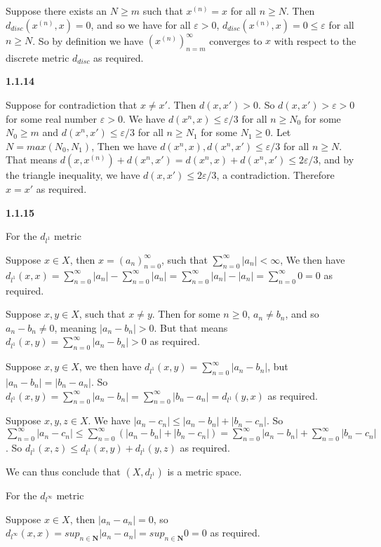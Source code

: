 \documentclass[12pt]{article}
\begin{document}
Suppose there exists an $N\geq m$ such that $x^{(n)} = x$ for all $n\geq N$. Then $d_{disc}(x^{(n)},x) = 0$, and so we have for all $\varepsilon >0$, $d_{disc}(x^{(n)},x) = 0\leq \varepsilon$ for all $n\geq N$. So by definition we have $(x^{(n)})_{n=m}^\infty$ converges to $x$ with respect to the discrete metric $d_{disc}$
as required.

\textbf{1.1.14}

Suppose for contradiction that $x\neq x'$. Then $d(x,x')>0$. So $d(x,x')>\varepsilon>0$ for some real number $\varepsilon>0$. We have $d(x^{n},x)\leq \varepsilon/3$ for all $n\geq N_0$ for some $N_0\geq m$ and $d(x^{n},x')\leq \varepsilon/3 $ for all $n\geq N_1$ for some $N_1\geq 0$. Let $N = max(N_0, N_1)$, Then we have $d(x^{n},x),d(x^{n},x')\leq \varepsilon/3$ for all $n\geq N$. That means $d(x,x^{(n)})+d(x^{n},x')=d(x^{n},x)+d(x^{n},x') \leq 2\varepsilon/3$, and by the triangle inequality, we have $d(x,x')\leq  2\varepsilon/3$, a contradiction. Therefore $x=x'$ as required. 

\textbf{1.1.15}

For the $d_{l^1}$ metric

Suppose $x\in X$, then $x=(a_n)^\infty_{n=0}$, such that $\sum_{n=0}^\infty|a_n|<\infty$, We  then have $d_{l^1}(x,x) = \sum_{n=0}^\infty|a_n|-\sum_{n=0}^\infty|a_n|=\sum_{n=0}^\infty|a_n|-|a_n| =\sum_{n=0}^\infty0=0$ as required. 

Suppose $x,y\in X$, such that $x\neq y$. Then for some $n\geq 0$, $a_n\neq b_n$, and so $a_n-b_n\neq 0$, meaning $|a_n-b_n|>0$. But that means $d_{l^1}(x,y) = \sum_{n=0}^\infty|a_n-b_n|>0$ as required. 

Suppose $x,y\in X$, we then have $d_{l^1}(x,y) = \sum_{n=0}^\infty|a_n-b_n|$, but $|a_n-b_n|=|b_n-a_n|$. So $d_{l^1}(x,y) = \sum_{n=0}^\infty|a_n-b_n|=\sum_{n=0}^\infty|b_n-a_n|=d_{l^1}(y,x)$ as required.

Suppose $x,y,z\in X$. We have $|a_n-c_n|\leq |a_n-b_n| + |b_n-c_n|$. So $\sum_{n=0}^\infty|a_n-c_n|\leq\sum_{n=0}^\infty( |a_n-b_n| + |b_n-c_n|)=\sum_{n=0}^\infty|a_n-b_n| + \sum_{n=0}^\infty|b_n-c_n|$. So $d_{l^1}(x,z) \leq d_{l^1}(x,y)+d_{l^1}(y,z)$ as required.

We can thus conclude that $(X,d_{l^1})$ is a metric space.

For the $d_{l^\infty}$ metric

Suppose $x\in X$, then $|a_n-a_n|= 0$, so $d_{l^\infty}(x,x)=sup_{n\in \textbf{N}}|a_n-a_n|= sup_{n\in \textbf{N}}0 = 0 $ as required.
\end{document}
